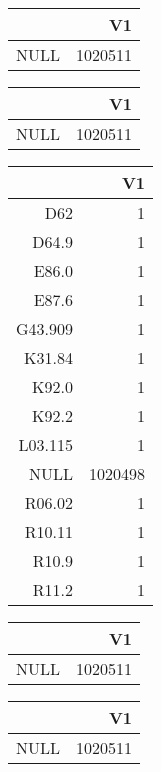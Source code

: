 \bigskip\bigskip
\centering
\begin{tabular}{rr}
  \hline
 & V1 \\ 
  \hline
NULL & 1020511 \\ 
   \hline
\end{tabular}

\bigskip\bigskip
\centering
\begin{tabular}{rr}
  \hline
 & V1 \\ 
  \hline
NULL & 1020511 \\ 
   \hline
\end{tabular}

\bigskip\bigskip
\centering
\begin{tabular}{rr}
  \hline
 & V1 \\ 
  \hline
D62 &   1 \\ 
  D64.9 &   1 \\ 
  E86.0 &   1 \\ 
  E87.6 &   1 \\ 
  G43.909 &   1 \\ 
  K31.84 &   1 \\ 
  K92.0 &   1 \\ 
  K92.2 &   1 \\ 
  L03.115 &   1 \\ 
  NULL & 1020498 \\ 
  R06.02 &   1 \\ 
  R10.11 &   1 \\ 
  R10.9 &   1 \\ 
  R11.2 &   1 \\ 
   \hline
\end{tabular}

\bigskip\bigskip
\centering
\begin{tabular}{rr}
  \hline
 & V1 \\ 
  \hline
NULL & 1020511 \\ 
   \hline
\end{tabular}

\bigskip\bigskip
\centering
\begin{tabular}{rr}
  \hline
 & V1 \\ 
  \hline
NULL & 1020511 \\ 
   \hline
\end{tabular}

